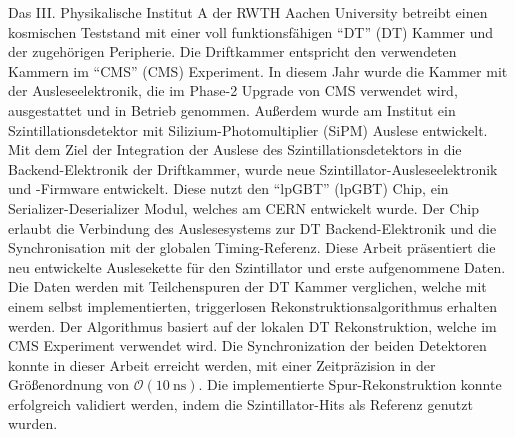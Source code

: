 \vspace{-0.5cm}
Das III. Physikalische Institut A der RWTH Aachen University betreibt einen kosmischen Teststand mit einer voll funktionsfähigen \enquote{\acl{DT}} (\acs{DT}) Kammer und der zugehörigen Peripherie. Die Driftkammer entspricht den verwendeten Kammern im \enquote{\acl{CMS}} (\acs{CMS}) Experiment. In diesem Jahr wurde die Kammer mit der Ausleseelektronik, die im Phase-2 Upgrade von \acs{CMS} verwendet wird, ausgestattet und in Betrieb genommen. Außerdem wurde am Institut ein Szintillationsdetektor mit Silizium-Photomultiplier (\acs{SiPM}) Auslese entwickelt. Mit dem Ziel der Integration der Auslese des Szintillationsdetektors in die Backend-Elektronik der Driftkammer, wurde neue Szintillator-Ausleseelektronik und -Firmware entwickelt. Diese nutzt den \enquote{\acl{lpGBT}} (\acs{lpGBT}) Chip, ein Serializer-Deserializer Modul, welches am \acs{CERN} entwickelt wurde. Der Chip erlaubt die Verbindung des Auslesesystems zur \acs{DT} Backend-Elektronik und die Synchronisation mit der globalen Timing-Referenz. Diese Arbeit präsentiert die neu entwickelte Auslesekette für den Szintillator und erste aufgenommene Daten. Die Daten werden mit Teilchenspuren der \acs{DT} Kammer verglichen, welche mit einem selbst implementierten, triggerlosen Rekonstruktionsalgorithmus erhalten werden. Der Algorithmus basiert auf der lokalen \acs{DT} Rekonstruktion, welche im \ac{CMS} Experiment verwendet wird. Die Synchronization der beiden Detektoren konnte in dieser Arbeit erreicht werden, mit einer Zeitpräzision in der Größenordnung von $\mathcal{O}(\SI{10}{\nano\second})$. Die implementierte Spur-Rekonstruktion konnte erfolgreich validiert werden, indem die Szintillator-Hits als Referenz genutzt wurden.

\acresetall